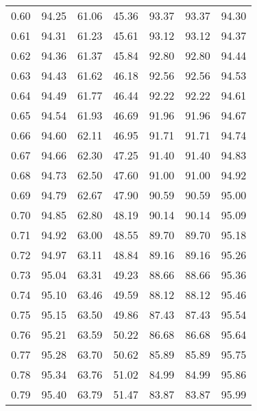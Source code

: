 \begin{tabular}{|c|c|c|c|c|c|c|}
      0.60 &     94.25 &     61.06 &      45.36 &   93.37 &      93.37 &         94.30 \\
      0.61 &     94.31 &     61.23 &      45.61 &   93.12 &      93.12 &         94.37 \\
      0.62 &     94.36 &     61.37 &      45.84 &   92.80 &      92.80 &         94.44 \\
      0.63 &     94.43 &     61.62 &      46.18 &   92.56 &      92.56 &         94.53 \\
      0.64 &     94.49 &     61.77 &      46.44 &   92.22 &      92.22 &         94.61 \\
      0.65 &     94.54 &     61.93 &      46.69 &   91.96 &      91.96 &         94.67 \\
      0.66 &     94.60 &     62.11 &      46.95 &   91.71 &      91.71 &         94.74 \\
      0.67 &     94.66 &     62.30 &      47.25 &   91.40 &      91.40 &         94.83 \\
      0.68 &     94.73 &     62.50 &      47.60 &   91.00 &      91.00 &         94.92 \\
      0.69 &     94.79 &     62.67 &      47.90 &   90.59 &      90.59 &         95.00 \\
      0.70 &     94.85 &     62.80 &      48.19 &   90.14 &      90.14 &         95.09 \\
      0.71 &     94.92 &     63.00 &      48.55 &   89.70 &      89.70 &         95.18 \\
      0.72 &     94.97 &     63.11 &      48.84 &   89.16 &      89.16 &         95.26 \\
      0.73 &     95.04 &     63.31 &      49.23 &   88.66 &      88.66 &         95.36 \\
      0.74 &     95.10 &     63.46 &      49.59 &   88.12 &      88.12 &         95.46 \\
      0.75 &     95.15 &     63.50 &      49.86 &   87.43 &      87.43 &         95.54 \\
      0.76 &     95.21 &     63.59 &      50.22 &   86.68 &      86.68 &         95.64 \\
      0.77 &     95.28 &     63.70 &      50.62 &   85.89 &      85.89 &         95.75 \\
      0.78 &     95.34 &     63.76 &      51.02 &   84.99 &      84.99 &         95.86 \\
      0.79 &     95.40 &     63.79 &      51.47 &   83.87 &      83.87 &         95.99 \\

\end{tabular}
